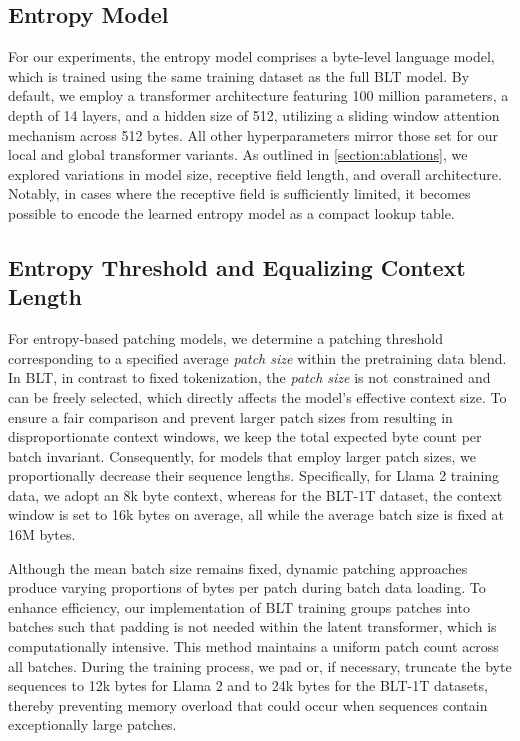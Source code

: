 \subsection{Entropy Model} For our experiments, the entropy model comprises a byte-level language model, which is trained using the same training dataset as the full {\textsc BLT} model. By default, we employ a transformer architecture featuring 100 million parameters, a depth of 14 layers, and a hidden size of 512, utilizing a sliding window attention mechanism across 512 bytes. All other hyperparameters mirror those set for our local and global transformer variants. As outlined in \autoref{section:ablations}, we explored variations in model size, receptive field length, and overall architecture. Notably, in cases where the receptive field is sufficiently limited, it becomes possible to encode the learned entropy model as a compact lookup table.

\subsection{Entropy Threshold and Equalizing Context Length} For entropy-based patching models, we determine a patching threshold corresponding to a specified average \textit{patch size} within the pretraining data blend. In {\textsc BLT}, in contrast to fixed tokenization, the \textit{patch size} is not constrained and can be freely selected, which directly affects the model's effective context size. To ensure a fair comparison and prevent larger patch sizes from resulting in disproportionate context windows, we keep the total expected byte count per batch invariant. Consequently, for models that employ larger patch sizes, we proportionally decrease their sequence lengths. Specifically, for Llama 2 training data, we adopt an 8k byte context, whereas for the {\textsc BLT}-1T dataset, the context window is set to 16k bytes on average, all while the average batch size is fixed at 16M bytes.

Although the mean batch size remains fixed, dynamic patching approaches produce varying proportions of bytes per patch during batch data loading. To enhance efficiency, our implementation of {\textsc BLT} training groups patches into batches such that padding is not needed within the latent transformer, which is computationally intensive. This method maintains a uniform patch count across all batches. During the training process, we pad or, if necessary, truncate the byte sequences to 12k bytes for Llama 2 and to 24k bytes for the {\textsc BLT}-1T datasets, thereby preventing memory overload that could occur when sequences contain exceptionally large patches.

